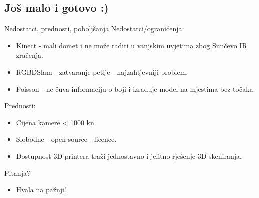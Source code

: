 \documentclass{beamer}
\begin{document}
\subsection{Još malo i gotovo :)}
\begin{frame}{Nedostatci, prednosti, poboljšanja}
    Nedostatci/ograničenja:
    \begin{itemize}
        \item <2-> Kinect - mali domet i ne može raditi u vanjskim
            uvjetima zbog Sunčevo IR zračenja.
        \item <3-> RGBDSlam - \alert{zatvaranje petlje} - najzahtjevniji problem.
        \item <4-> Poisson - ne čuva informaciju o boji i izrađuje model
            na mjestima bez točaka.
    \end{itemize}
    Prednosti:
    \begin{itemize}
        \item <5-> Cijena kamere < 1000 kn
        \item <6-> Slobodne - open source - licence.
        \item <7-> Dostupnost 3D printera traži jednostavno i jefitno
            rješenje 3D skeniranja.
    \end{itemize}
\end{frame}

\begin{frame}{Pitanja?}
    \begin{itemize}
        \item <1-> Hvala na pažnji!
    \end{itemize}
\end{frame}
\end{document}
